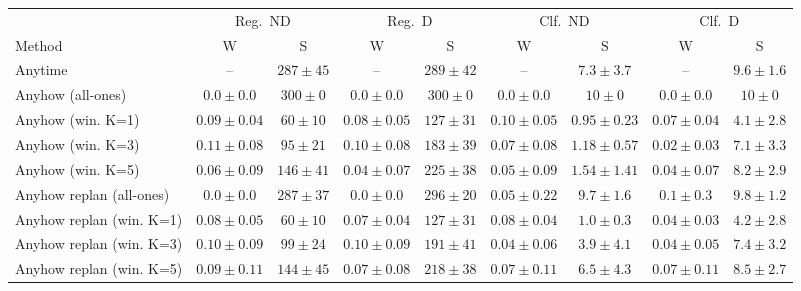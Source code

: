 \documentclass{uai2026} %
\newcommand{\1}{\mathbf{1}}
\begin{document}
\begin{table}[t]
\small
\begin{tabular}{@{}l|cc|cc|cc|cc@{}}
  \toprule
  & \multicolumn{2}{c|}{Reg.\ ND}
  & \multicolumn{2}{c|}{Reg.\ D}
  & \multicolumn{2}{c|}{Clf.\ ND}
  & \multicolumn{2}{c}{Clf.\ D} \\
  \cmidrule(lr){2-3}\cmidrule(lr){4-5}\cmidrule(lr){6-7}\cmidrule(lr){8-9}
  Method            & W & S & W & S & W & S & W & S \\
  \midrule
  Anytime                   & -- & $287{\pm}45$ & -- & $289{\pm}42$ & -- & $7.3{\pm}3.7$ & -- & $9.6{\pm}1.6$ \\
  Anyhow (all-ones)         & $0.0{\pm}0.0$ & $300{\pm}0$ & $0.0{\pm}0.0$ & $300{\pm}0$ & $0.0{\pm}0.0$ & $10{\pm}0$ & $0.0{\pm}0.0$ & $10{\pm}0$ \\
  Anyhow (win. K=1)         & $0.09{\pm}0.04$ & $60{\pm}10$ & $0.08{\pm}0.05$ & $127{\pm}31$ & $0.10{\pm}0.05$ & $0.95{\pm}0.23$ & $0.07{\pm}0.04$ & $4.1{\pm}2.8$ \\
  Anyhow (win. K=3)         & $0.11{\pm}0.08$ & $95{\pm}21$ & $0.10{\pm}0.08$ & $183{\pm}39$ & $0.07{\pm}0.08$ & $1.18{\pm}0.57$ & $0.02{\pm}0.03$ & $7.1{\pm}3.3$ \\
  Anyhow (win. K=5)         & $0.06{\pm}0.09$ & $146{\pm}41$ & $0.04{\pm}0.07$ & $225{\pm}38$ & $0.05{\pm}0.09$ & $1.54{\pm}1.41$ & $0.04{\pm}0.07$ & $8.2{\pm}2.9$ \\
  Anyhow replan (all-ones)  & $0.0{\pm}0.0$ & $287{\pm}37$ & $0.0{\pm}0.0$ & $296{\pm}20$ & $0.05{\pm}0.22$ & $9.7{\pm}1.6$ & $0.1{\pm}0.3$ & $9.8{\pm}1.2$ \\
  Anyhow replan (win. K=1)  & $0.08{\pm}0.05$ & $60{\pm}10$ & $0.07{\pm}0.04$ & $127{\pm}31$ & $0.08{\pm}0.04$ & $1.0{\pm}0.3$ & $0.04{\pm}0.03$ & $4.2{\pm}2.8$ \\
  Anyhow replan (win. K=3)  & $0.10{\pm}0.09$ & $99{\pm}24$ & $0.10{\pm}0.09$ & $191{\pm}41$ & $0.04{\pm}0.06$ & $3.9{\pm}4.1$ & $0.04{\pm}0.05$ & $7.4{\pm}3.2$ \\
  Anyhow replan (win. K=5)  & $0.09{\pm}0.11$ & $144{\pm}45$ & $0.07{\pm}0.08$ & $218{\pm}38$ & $0.07{\pm}0.11$ & $6.5{\pm}4.3$ & $0.07{\pm}0.11$ & $8.5{\pm}2.7$ \\
  \bottomrule
\end{tabular}

  \label{tab:results}
\end{table}
\end{document}
